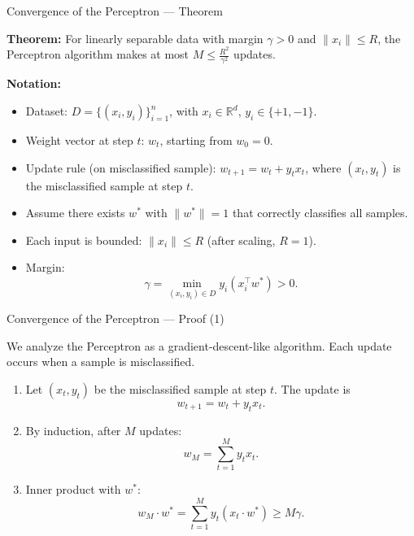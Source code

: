 \documentclass[serif, aspectratio=169]{beamer}
\begin{document}
    \begin{frame}{Convergence of the Perceptron — Theorem}

        \textbf{Theorem:}
        For linearly separable data with margin $\gamma > 0$ and $\|x_i\| \le R$,
        the Perceptron algorithm makes at most $M \le \tfrac{R^2}{\gamma^2}$ updates.

        \vspace{0.8em}

        \textbf{Notation:}

        \begin{itemize}
            \item Dataset: $D = \{(x_i, y_i)\}_{i=1}^n$, with $x_i \in \mathbb{R}^d$, $y_i \in \{+1, -1\}$.
            \item Weight vector at step $t$: $w_t$, starting from $w_0 = 0$.
            \item Update rule (on misclassified sample):
            $w_{t+1} = w_t + y_t x_t$, where $(x_t, y_t)$ is the misclassified sample at step $t$.
            \item Assume there exists $w^*$ with $\|w^*\| = 1$ that correctly classifies all samples.
            \item Each input is bounded: $\|x_i\| \le R$ (after scaling, $R = 1$).
            \item Margin:
            \[
                \gamma = \min_{(x_i, y_i) \in D} y_i (x_i^\top w^*) > 0.
            \]
        \end{itemize}

    \end{frame}



    \begin{frame}{Convergence of the Perceptron — Proof (1)}

        We analyze the Perceptron as a gradient-descent-like algorithm.
        Each update occurs when a sample is misclassified.

        \begin{enumerate}
            \item Let $(x_t, y_t)$ be the misclassified sample at step $t$.
            The update is
            \[
                w_{t+1} = w_t + y_t x_t.
            \]
            \item By induction, after $M$ updates:
            \[
                w_M = \sum_{t=1}^{M} y_t x_t.
            \]
            \item Inner product with $w^*$:
            \[
                w_M \cdot w^* = \sum_{t=1}^{M} y_t (x_t \cdot w^*) \ge M \gamma.
            \]
        \end{enumerate}

    \end{frame}
\end{document}
